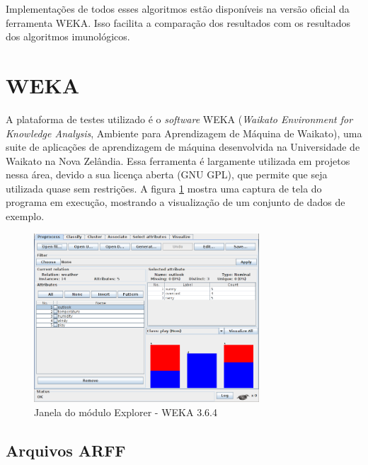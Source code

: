 Implementações de todos esses algoritmos estão disponíveis na versão oficial da ferramenta WEKA. Isso facilita a comparação dos resultados com os resultados dos algoritmos imunológicos.

\section{WEKA}
\label{sec:prop_weka}

A plataforma de testes utilizado é o \emph{software} WEKA (\emph{Waikato Environment for Knowledge Analysis}, Ambiente para Aprendizagem de Máquina de Waikato), uma suite de aplicações de aprendizagem de máquina desenvolvida na Universidade de Waikato na Nova Zelândia. Essa ferramenta é largamente utilizada em projetos nessa área, devido a sua licença aberta (GNU GPL), que permite que seja utilizada quase sem restrições. A figura \ref{fig:prop_weka} mostra uma captura de tela do programa em execução, mostrando a visualização de um conjunto de dados de exemplo.

\vspace{0.5cm}
\begin{figure}[h]
    \centering
    \caption{Janela do módulo Explorer - WEKA 3.6.4}
    \label{fig:prop_weka}
    \vspace{0.5cm}
    \includegraphics[width=0.75\textwidth]{img/weka.png}
\end{figure}
\vspace{0.5cm}

\subsection{Arquivos ARFF}
\label{sec:prop_arff}

